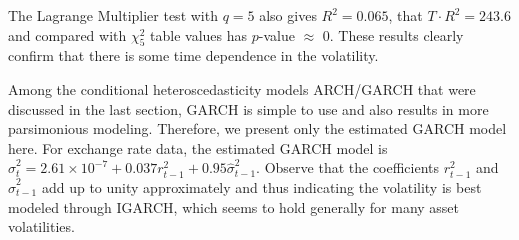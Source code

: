 The Lagrange Multiplier test with $q=5$ also gives $R^2= 0.065$, that $T \cdot R^2 = 243.6$ and compared with $\chi_5^2$ table values has $p$-value $\approx$ 0. These results clearly confirm that there is some time dependence in the volatility.


Among the conditional heteroscedasticity models ARCH/GARCH that were discussed in the last section, GARCH is simple to use and also results in more parsimonious modeling. Therefore, we present only the estimated GARCH model here. For exchange rate data, the estimated GARCH model is $\hat{\sigma}_t^2 = 2.61 \times 10^{-7} + 0.037r_{t-1}^2 + 0.95\hat{\sigma}_{t-1}^2$. Observe that the coefficients $r_{t-1}^2$ and $\hat{\sigma}_{t-1}^2$ add up to unity approximately and thus indicating the volatility is best modeled through IGARCH, which seems to hold generally for many asset volatilities.